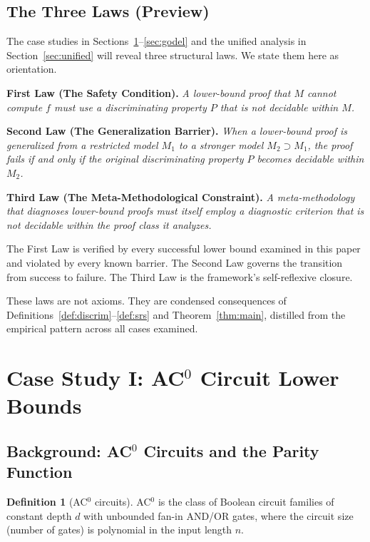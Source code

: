 \documentclass[11pt,a4paper]{article}
\theoremstyle{plain}
\theoremstyle{definition}
\newtheorem{definition}[theorem]{Definition}
\theoremstyle{remark}
\begin{document}
\subsection{The Three Laws (Preview)}

The case studies in Sections~\ref{sec:ac0}--\ref{sec:godel} and the unified analysis in Section~\ref{sec:unified} will reveal three structural laws. We state them here as orientation.

\textbf{First Law (The Safety Condition).} \emph{A lower-bound proof that $M$ cannot compute $f$ must use a discriminating property $P$ that is not decidable within $M$.}

\textbf{Second Law (The Generalization Barrier).} \emph{When a lower-bound proof is generalized from a restricted model $M_1$ to a stronger model $M_2 \supset M_1$, the proof fails if and only if the original discriminating property $P$ becomes decidable within $M_2$.}

\textbf{Third Law (The Meta-Methodological Constraint).} \emph{A meta-methodology that diagnoses lower-bound proofs must itself employ a diagnostic criterion that is not decidable within the proof class it analyzes.}

The First Law is verified by every successful lower bound examined in this paper and violated by every known barrier. The Second Law governs the transition from success to failure. The Third Law is the framework's self-reflexive closure.

These laws are not axioms. They are condensed consequences of Definitions~\ref{def:discrim}--\ref{def:srs} and Theorem~\ref{thm:main}, distilled from the empirical pattern across all cases examined.

\section{Case Study I: AC$^0$ Circuit Lower Bounds}
\label{sec:ac0}

\subsection{Background: AC$^0$ Circuits and the Parity Function}

\begin{definition}[AC$^0$ circuits]
AC$^0$ is the class of Boolean circuit families of constant depth $d$ with unbounded fan-in AND/OR gates, where the circuit size (number of gates) is polynomial in the input length $n$.
\end{definition}
\end{document}
